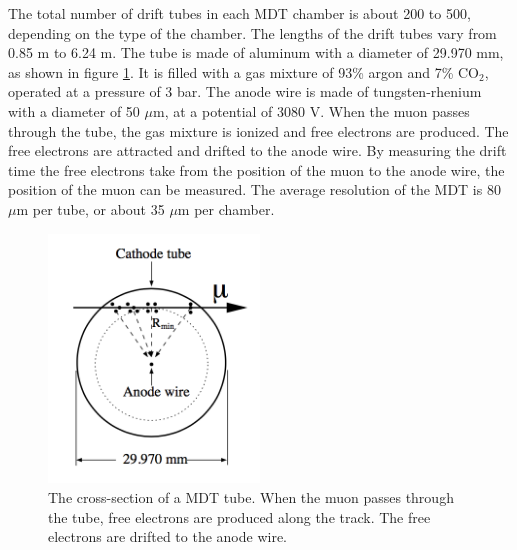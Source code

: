 The total number of drift tubes in each MDT chamber is about 200 to 500, depending on the type of the chamber.
The lengths of the drift tubes vary from 0.85 m to 6.24 m.
The tube is made of aluminum with a diameter of 29.970 mm, as shown in figure \ref{fig:MDT}.
It is filled with a gas mixture of 93\% argon and 7\% CO$_2$, operated at a pressure of 3 bar.
The anode wire is made of tungsten-rhenium with a diameter of 50 $\mu$m, at a potential of 3080 V.
When the muon passes through the tube, the gas mixture is ionized and free electrons are produced.
The free electrons are attracted and drifted to the anode wire.
By measuring the drift time the free electrons take from the position of the muon to the anode wire, the position of the muon can be measured.
The average resolution of the MDT is 80 $\mu$m per tube, or about 35 $\mu$m per chamber.

\begin{figure}
\centering
\includegraphics[width=0.5\textwidth]{data/photo/detector/MDT.png}
\caption{The cross-section of a MDT tube. When the muon passes through the tube, free electrons are produced along the track. The free electrons are drifted to the anode wire. \cite{ATLAS_doc}}
\label{fig:MDT}
\end{figure}
